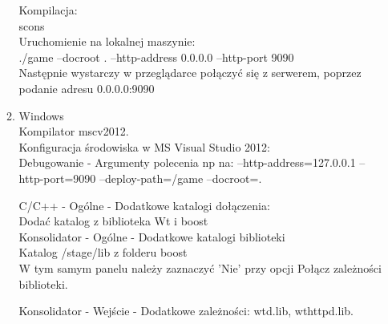 \documentclass{report}
\begin{document}
\begin{enumerate}
\begin{enumerate}
Kompilacja: \\
scons \\
Uruchomienie na lokalnej maszynie: \\
./game --docroot . --http-address 0.0.0.0 --http-port 9090\\
Następnie wystarczy w przeglądarce połączyć się z serwerem, poprzez podanie adresu 0.0.0.0:9090


\item Windows \\
Kompilator mscv2012. \\ Konfiguracja środowiska w MS Visual Studio 2012: \\
Debugowanie - Argumenty polecenia np na: --http-address=127.0.0.1 --http-port=9090 --deploy-path=/game --docroot=.

C/C++ - Ogólne - Dodatkowe katalogi dołączenia: \\
Dodać katalog z biblioteka Wt i boost \\

Konsolidator - Ogólne - Dodatkowe katalogi biblioteki \\
Katalog /stage/lib z folderu boost \\ 
W tym samym panelu należy zaznaczyć 'Nie' przy opcji Połącz zależności biblioteki.

Konsolidator - Wejście - Dodatkowe zależności:
wtd.lib, wthttpd.lib.


\end{enumerate}

\end{enumerate}
\end{document}
